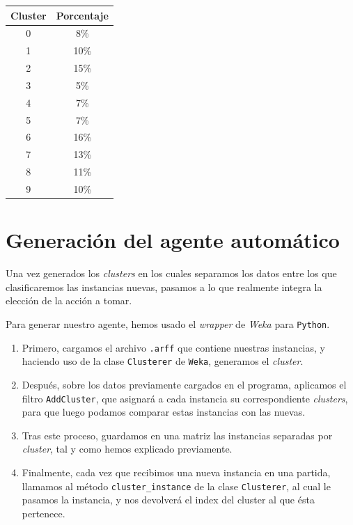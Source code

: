 \documentclass[12pt]{article}
\begin{document}
\begin{center}
    \begin{tabular}{c | c}
        \hline
        Cluster & Porcentaje \\
        \hline
        0   &    8\% \\
        1   &   10\% \\
        2   &   15\% \\
        3   &    5\% \\
        4   &    7\% \\
        5   &    7\% \\
        6   &   16\% \\
        7   &   13\% \\
        8   &   11\% \\
        9   &   10\% \\
    \end{tabular}
\end{center}

\newpage
\section{Generación del agente automático}

Una vez generados los \textit{clusters} en los cuales separamos los datos entre los que clasificaremos las instancias nuevas, pasamos a lo que realmente integra la elección de la acción a tomar.

Para generar nuestro agente, hemos usado el \textit{wrapper} de \textit{Weka} para \texttt{Python}.

\begin{enumerate}
    \item Primero, cargamos el archivo \texttt{.arff} que contiene nuestras instancias, y haciendo uso de la clase \texttt{Clusterer} de \texttt{Weka}, generamos el \textit{cluster}.
    \item Después, sobre los datos previamente cargados en el programa, aplicamos el filtro \texttt{AddCluster}, que asignará a cada instancia su correspondiente \textit{clusters}, para que luego podamos comparar estas instancias con las nuevas.
    \item Tras este proceso, guardamos en una matriz las instancias separadas por \textit{cluster}, tal y como hemos explicado previamente.
    \item Finalmente, cada vez que recibimos una nueva instancia en una partida, llamamos al método \texttt{cluster\_instance} de la clase \texttt{Clusterer}, al cual le pasamos la instancia, y nos devolverá el index del cluster al que ésta pertenece.
\end{enumerate}
\end{document}
